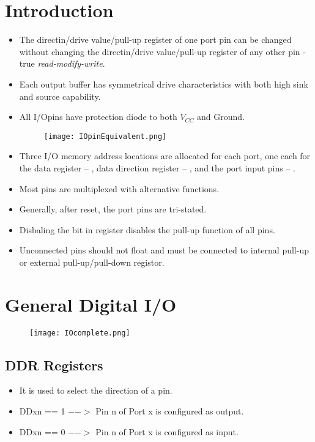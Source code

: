 \documentclass{article}
\begin{document}
\section{Introduction}
\begin{itemize}
    \item The directin/drive value/pull-up register of one port pin can be changed without changing the directin/drive value/pull-up register  of any other pin - true \emph{read-modify-write}.
    \item Each output buffer has symmetrical drive characteristics with both high sink and source capability.
    \item All I/Opins have protection diode to both $V_{CC}$ and Ground.
    \begin{figure}[H]
        \begin{center}
            \texttt{[image: IOpinEquivalent.png]}
        \end{center}
    \end{figure}
    \item Three I/O memory address locations are allocated for each port, one each for the data register – , data direction register – , and the port input pins – .
    \item Most pins are multiplexed with alternative functions.
    \item Generally, after reset, the port pins are tri-stated.
    \item Disbaling the  bit in  register disables the pull-up function of all pins.
    \item Unconnected pins should not float and must be connected to internal pull-up or external pull-up/pull-down registor.
\end{itemize}


\section{General Digital I/O}
\begin{figure}[H]
    \begin{center}
        \texttt{[image: IOcomplete.png]}
    \end{center}
\end{figure}

\subsection{DDR Registers}
\begin{itemize}
    \item It is used to select the direction of a pin.
    \item DDxn == 1 $-->$ Pin n of Port x is configured as output.
    \item DDxn == 0 $-->$ Pin n of Port x is configured as input.
\end{itemize}
\end{document}
